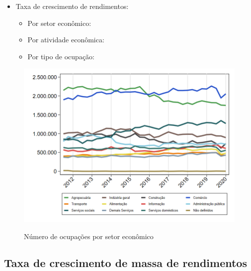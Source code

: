 \documentclass[8pt]{beamer}
\begin{document}
\begin{frame}[label=indice_principal_amz]{}
\begin{itemize}
\item{Taxa de crescimento de rendimentos:
	\begin{itemize}
	\item{Por setor econômico: \hyperlink{rkngtxrendaporsetor}{}}
	\item{Por atividade econômica: \hyperlink{rkngtxrendaporatividade}{}}
	\item{Por tipo de ocupação: \hyperlink{rkngtxrendaporocupacao}{}}
	\end{itemize}
}
\vspace{1mm}

\end{itemize}

\end{frame}

\begin{frame}
\textit{\hyperlink{indice_principal_amz}{}}
\begin{figure}
  \centering
  \includegraphics[width=.85\linewidth]{./../analysis/output/_importancia_relativa.png}
  \label{_importancia_relativa}
  \caption{{Número de ocupações por setor econômico}}
\end{figure}
\end{frame}

\subsection{Taxa de crescimento de massa de rendimentos}

\begin{frame}
\textit{\hyperlink{indice_principal_amz}{}}

\end{frame}
\end{document}
